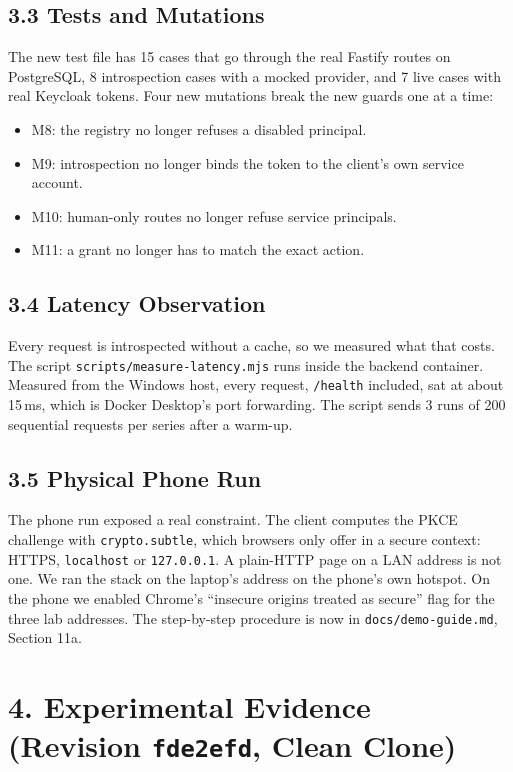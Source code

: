 \documentclass{article}
\begin{document}
\subsection*{3.3 Tests and Mutations}
The new test file has 15 cases that go through the real Fastify routes on PostgreSQL, 8 introspection cases with a mocked provider, and 7 live cases with real Keycloak tokens. Four new mutations break the new guards one at a time:
\begin{itemize}
    \item M8: the registry no longer refuses a disabled principal.
    \item M9: introspection no longer binds the token to the client's own service account.
    \item M10: human-only routes no longer refuse service principals.
    \item M11: a grant no longer has to match the exact action.
\end{itemize}

\subsection*{3.4 Latency Observation}
Every request is introspected without a cache, so we measured what that costs. The script \texttt{scripts/measure-latency.mjs} runs inside the backend container. Measured from the Windows host, every request, \texttt{/health} included, sat at about 15\,ms, which is Docker Desktop's port forwarding. The script sends 3 runs of 200 sequential requests per series after a warm-up.

\subsection*{3.5 Physical Phone Run}
The phone run exposed a real constraint. The client computes the PKCE challenge with \texttt{crypto.subtle}, which browsers only offer in a secure context: HTTPS, \texttt{localhost} or \texttt{127.0.0.1}. A plain-HTTP page on a LAN address is not one. We ran the stack on the laptop's address on the phone's own hotspot. On the phone we enabled Chrome's ``insecure origins treated as secure'' flag for the three lab addresses. The step-by-step procedure is now in \texttt{docs/demo-guide.md}, Section 11a.

\section*{4. Experimental Evidence (Revision \texttt{fde2efd}, Clean Clone)}
\end{document}
